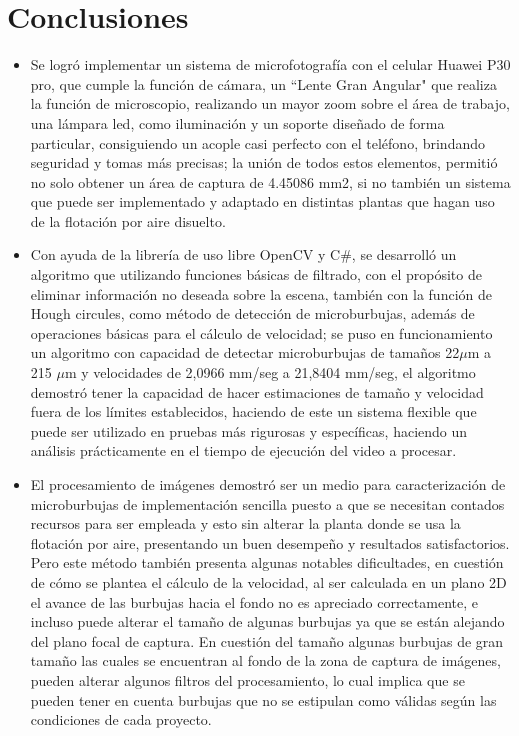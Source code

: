 \documentclass[12pt,twocolumn,a4paper]{article}
\begin{document}
\section{Conclusiones }
\begin{itemize}
\item Se logró implementar un sistema de microfotografía con el celular Huawei P30 pro, que cumple la función de  cámara, un “Lente Gran Angular" que realiza la función de microscopio, realizando un mayor zoom sobre el área de trabajo, una lámpara led, como iluminación y un soporte diseñado de forma particular, consiguiendo un acople casi perfecto con el teléfono, brindando seguridad y tomas más precisas; la unión de todos estos elementos, permitió no solo obtener un área de captura de  4.45086 mm2, si no también un sistema que puede ser implementado y adaptado en distintas plantas que hagan uso de la flotación por aire disuelto.
\item Con ayuda de la librería de uso libre OpenCV  y C\#, se desarrolló un algoritmo que utilizando funciones básicas de filtrado, con el propósito de eliminar información no deseada sobre la escena,   también con la función de Hough circules, como método de detección de microburbujas, además de operaciones básicas para el cálculo de velocidad; se puso en funcionamiento un algoritmo con capacidad de detectar microburbujas de tamaños 22$\mu$m a 215 $\mu$m  y velocidades de 2,0966 mm/seg a  21,8404 mm/seg, el algoritmo demostró tener la capacidad de hacer estimaciones de tamaño y velocidad fuera de los límites establecidos, haciendo de este un sistema flexible que puede ser utilizado en pruebas más rigurosas y específicas, haciendo un análisis prácticamente en el tiempo de ejecución del video a procesar.
\item El procesamiento de imágenes demostró ser un medio para caracterización de microburbujas de implementación sencilla puesto a que se necesitan contados recursos para ser empleada y esto sin alterar la planta donde se usa la flotación por aire, presentando un buen desempeño y resultados satisfactorios. Pero este método también presenta algunas notables dificultades, en cuestión de cómo se plantea el cálculo de la velocidad, al ser calculada en un plano 2D el avance de las burbujas hacia el fondo no es apreciado correctamente, e incluso puede alterar el tamaño de algunas burbujas ya que se están alejando del plano focal de captura. En cuestión del tamaño algunas burbujas de gran tamaño las cuales se encuentran al fondo de la zona de captura de imágenes, pueden alterar algunos filtros del procesamiento, lo cual implica que se pueden tener en cuenta burbujas que no se estipulan como válidas según las condiciones de cada proyecto.

\end{itemize}
\end{document}
